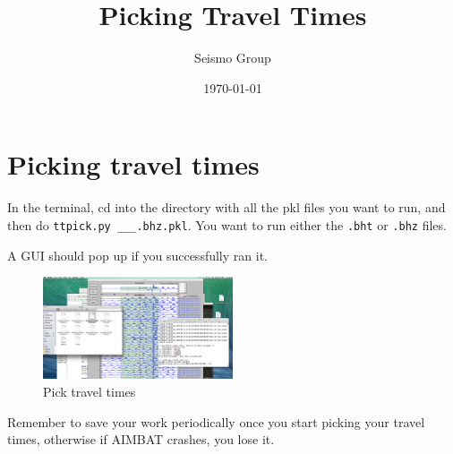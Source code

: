 \documentclass[letterpaper,10pt]{article}
\title{Picking Travel Times}
\author{Seismo Group}
\date{\today}
\begin{document}
\maketitle


\section{Picking travel times}

In the terminal, cd into the directory with all the pkl files you want to run, and then do \verb"ttpick.py ___.bhz.pkl". You want to run either the \verb".bht" or \verb".bhz" files. 

A GUI should pop up if you successfully ran it.  

\begin{figure}[h!]
  \centering
  \includegraphics[width=0.5\textwidth]{images/pick_travel_times}
  \caption{Pick travel times}
  \label{fig:pick_travel_times}
\end{figure}

Remember to save your work periodically once you start picking your travel times, otherwise if AIMBAT crashes, you lose it. 


\end{document}
